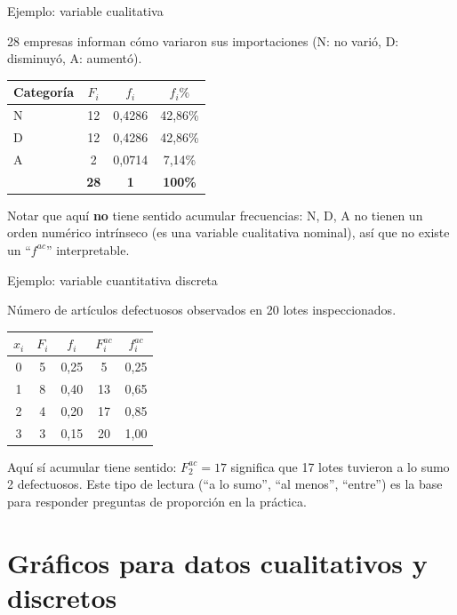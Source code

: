 \documentclass[aspectratio=169,11pt]{beamer}
\begin{document}
\begin{frame}{Ejemplo: variable cualitativa}
\begin{example}
28 empresas informan cómo variaron sus importaciones (N: no varió, D: disminuyó, A: aumentó).
\end{example}
\centering
\begin{tabular}{lccc}
\toprule
Categoría & $F_i$ & $f_i$ & $f_i\%$ \\
\midrule
N & 12 & 0,4286 & 42,86\% \\
D & 12 & 0,4286 & 42,86\% \\
A & 2 & 0,0714 & 7,14\% \\
\bottomrule
& \textbf{28} & \textbf{1} & \textbf{100\%} \\
\end{tabular}
\vspace{0.5em}

Notar que aquí \textbf{no} tiene sentido acumular frecuencias: N, D, A no tienen un orden numérico intrínseco (es una variable cualitativa nominal), así que no existe un ``$f^{ac}$'' interpretable.
\end{frame}

\begin{frame}{Ejemplo: variable cuantitativa discreta}
\begin{example}
Número de artículos defectuosos observados en 20 lotes inspeccionados.
\end{example}
\centering
\small
\begin{tabular}{ccccc}
\toprule
$x_i$ & $F_i$ & $f_i$ & $F_i^{ac}$ & $f_i^{ac}$ \\
\midrule
0 & 5 & 0,25 & 5 & 0,25 \\
1 & 8 & 0,40 & 13 & 0,65 \\
2 & 4 & 0,20 & 17 & 0,85 \\
3 & 3 & 0,15 & 20 & 1,00 \\
\bottomrule
\end{tabular}
\vspace{0.5em}
\normalsize
Aquí sí acumular tiene sentido: $F_2^{ac}=17$ significa que 17 lotes tuvieron a lo sumo 2 defectuosos. Este tipo de lectura (``a lo sumo'', ``al menos'', ``entre'') es la base para responder preguntas de proporción en la práctica.
\end{frame}

\section{Gráficos para datos cualitativos y discretos}
\end{document}
